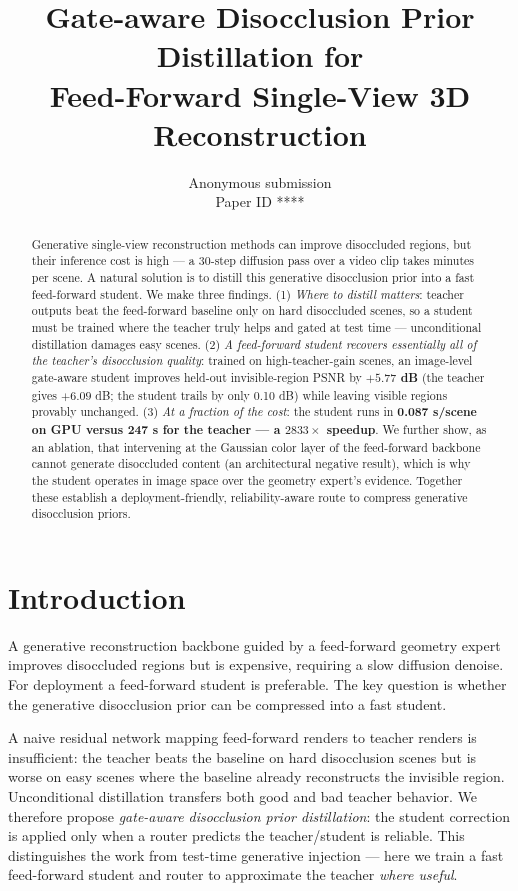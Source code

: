 \documentclass[10pt,twocolumn,letterpaper]{article}
\title{Gate-aware Disocclusion Prior Distillation for\\ Feed-Forward Single-View 3D Reconstruction}
\author{Anonymous submission\\\small Paper ID ****}
\date{}
\begin{document}
\maketitle

\begin{abstract}
Generative single-view reconstruction methods can improve disoccluded regions,
but their inference cost is high --- a 30-step diffusion pass over a video clip
takes minutes per scene. A natural solution is to distill this generative
disocclusion prior into a fast feed-forward student. We make three findings.
(1) \emph{Where to distill matters}: teacher outputs beat the feed-forward
baseline only on hard disoccluded scenes, so a student must be trained where the
teacher truly helps and gated at test time --- unconditional distillation
damages easy scenes. (2) \emph{A feed-forward student recovers essentially all of
the teacher's disocclusion quality}: trained on high-teacher-gain scenes, an
image-level gate-aware student improves held-out invisible-region PSNR by
\textbf{$+5.77$ dB} (the teacher gives $+6.09$ dB; the student trails by only
0.10 dB) while leaving visible regions provably unchanged. (3) \emph{At a
fraction of the cost}: the student runs in \textbf{0.087 s/scene on GPU versus
247 s for the teacher --- a $2833\times$ speedup}. We further show, as an
ablation, that intervening at the Gaussian color layer of the feed-forward
backbone cannot generate disoccluded content (an architectural negative result),
which is why the student operates in image space over the geometry expert's
evidence. Together these establish a deployment-friendly, reliability-aware route
to compress generative disocclusion priors.
\end{abstract}

\section{Introduction}
\label{sec:intro}
A generative reconstruction backbone guided by a feed-forward geometry expert
improves disoccluded regions but is expensive, requiring a slow diffusion
denoise. For deployment a feed-forward student is preferable. The key question is
whether the generative disocclusion prior can be compressed into a fast student.

A naive residual network mapping feed-forward renders to teacher renders is
insufficient: the teacher beats the baseline on hard disocclusion scenes but is
worse on easy scenes where the baseline already reconstructs the invisible
region. Unconditional distillation transfers both good and bad teacher behavior.
We therefore propose \emph{gate-aware disocclusion prior distillation}: the
student correction is applied only when a router predicts the teacher/student is
reliable. This distinguishes the work from test-time generative injection ---
here we train a fast feed-forward student and router to approximate the teacher
\emph{where useful}.
\end{document}
